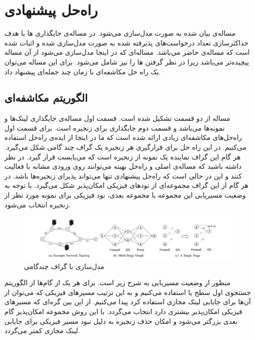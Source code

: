 
\chapter{راه‌حل پیشنهادی}

مساله‌ی بیان شده به صورت 
مدل‌سازی می‌شود.
در \cite{Eramo2016}
مساله‌ی جایگذاری ها با هدف حداکثرسازی تعداد درخواست‌های پذیرفته شده
به صورت  مدل‌سازی شده و اثبات شده است که مساله‌ی حاضر  می‌باشد.
مساله‌ای که در اینجا مدل‌سازی می‌شود از آن مساله پیچیده‌تر می‌باشد زیرا در نظر گرفتن ها را نیز شامل می‌شود.
برای این مساله می‌توان
یک راه حل مکاشفه‌ای با زمان چند جمله‌ای
پیشنهاد داد.

\section{الگوریتم مکاشفه‌ای}

مساله از دو قسمت تشکیل شده است. قسمت اول مساله‌ی جایگذاری لینک‌ها و نمونه‌ها می‌باشد
و قسمت دوم جایگذاری
برای زنجیره است.
برای قسمت اول راه‌حل‌های مکاشفه‌ای زیادی ارائه شده است که ما در اینجا
از ایده‌ی راه‌حل \cite{Bari2015} استفاده می‌کنیم.
در این راه حل برای قرارگیری هر زنجیره یک گراف چند گامی شکل می‌گیرد.
هر گام این گراف نماینده یک نمونه از زنجیره است که می‌بایست قرار گیرد.
در نظر داشته باشید که مساله‌ی اصلی و راه‌حل بهینه می‌توانند روی ورودی مشابه با 
فعالیت کنند و این در حالی است که راه‌حل پیشنهادی تنها می‌تواند پذیرای زنجیره‌ها باشد.
در هر گام از این گراف مجموعه‌ای از نودهای فیزیکی امکان‌پذیر شکل می‌گیرد.
با توجه به وضعیت مسیریابی این مجموعه با مجموعه بعدی، نود فیزیکی برای نمونه مورد نظر از زنجیره انتخاب می‌شود.

\begin{figure}[h]
\center\includegraphics[scale=.45]{images/bari}
\caption{مدل‌سازی با گراف چندگامی \cite{Bari2015}}
\label{fig.5}
\end{figure}

منظور از وضعیت مسیریابی به شرح زیر است. برای هر یک از گام‌ها از الگوریتم جستجوی اول سطح یا
استفاده می‌کنیم
و به این ترتیب مسیرهای فیزیکی که می‌توان از آن‌ها برای جایابی لینک مجازی استفاده کرد پیدا می‌کنیم.
از این بین گره‌ای که مسیرهای فیزیکی امکان‌پذیر بیشتری دارد انتخاب می‌گردد.
با این روش مجموعه امکان‌پذیر گام بعدی بزرگتر می‌شود و امکان حذف زنجیره به دلیل نبود مسیر فیزیکی
برای جایابی لینک مجازی کمتر می‌گردد.

